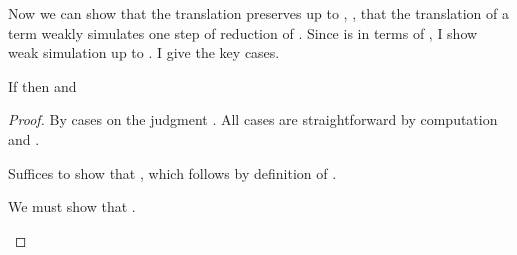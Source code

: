 Now we can show that the translation preserves  up to
, \ie, that the translation \im{\pcce} of a term \im{\se}
weakly simulates one step of reduction of \im{\se}.
Since  is in terms of , I show weak simulation up to .
I give the key cases.
\begin{lemma}
  \label{lem:cc:pres-red}
  If \im{\sstepjudg[\step_x]{\slenv}{\se}{\sepr}} then
  \im{\pccstepjudg[\stepstar]{\cctrans{\slenv}}{\cctrans{\se}}{\pcce}} and \im{\pcce \equiv \cctrans{\sepr}}
\end{lemma}
\begin{proof}
  By cases on the judgment .
  All cases are straightforward by computation
  and .
  \begin{proofcases}
  \item \im{\sx \step_\delta \sepr~\where{\sx = \sepr \in \slenv}}

    Suffices to show that \im{\pccx \step_\delta \cctrans{\sepr}~\where{\pccx = \cctrans{\sepr} \in \slenv}}, which follows by definition of \im{\pccenvjudg{\slenv}{\pcclenv}}.
  \item \im{\sappe{(\sfune{\sx}{\sA}{\seone})}{\setwo} \step_\beta \subst{\seone}{\setwo}{\sx}}

    We must show that \im{\cctrans{(\sappe{(\sfune{\sx}{\sA}{\seone})}{\setwo})}
      \stepstar \pccepr \equiv  \cctrans{(\subst{\seone}{\setwo}{\sx})}}.


\end{proofcases}
\end{proof}
